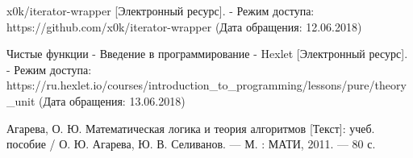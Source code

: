 \begin{thebibliography}{00}
  x0k/iterator-wrapper
  [Электронный ресурс]. - Режим доступа: https://github.com/x0k/iterator-wrapper
  (Дата обращения: 12.06.2018)

  Чистые функции - Введение в программирование - Hexlet
  [Электронный ресурс]. - Режим доступа: https://ru.hexlet.io/courses/introduction\_to\_programming/lessons/pure/theory \_unit
  (Дата обращения: 13.06.2018)

  Агарева, О. Ю.
  Математическая логика и теория алгоритмов
  [Текст]: учеб. пособие /
  О. Ю. Агарева, Ю. В. Селиванов. --- М. : МАТИ, 2011. — 80 с.

\end{thebibliography}
\endgroup

\clearpage